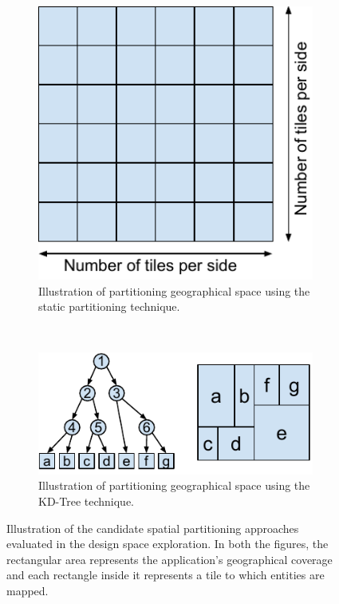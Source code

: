 \begin{figure}
\centering
\begin{subfigure}{0.33\textwidth}
  \centering
  \includegraphics[width=\linewidth]{figures/design_space/spatial/static_partitioning.pdf}
  \caption{Illustration of partitioning geographical space using the static partitioning technique.}
  \label{fig:static_part}
\end{subfigure}%
~~~~~~~~
\begin{subfigure}{0.66\textwidth}
  \centering
  \includegraphics[width=\linewidth]{figures/design_space/spatial/kdtree_partitioning.pdf}
  \caption{Illustration of partitioning geographical space using the KD-Tree technique.}
  \label{fig:kdtree_part}
\end{subfigure}\par\medskip
\caption{Illustration of the candidate spatial partitioning approaches evaluated in the design space exploration. In both the figures, the rectangular area represents the application's geographical coverage and each rectangle inside it represents a tile to which entities are mapped.}
\end{figure}


